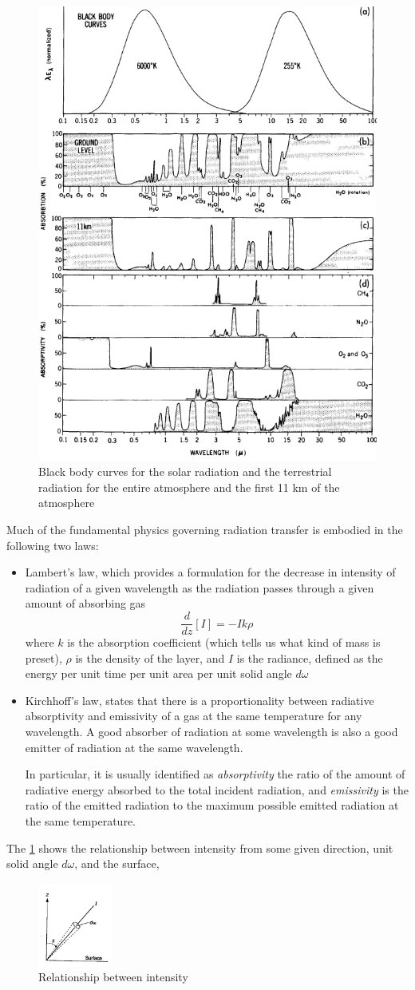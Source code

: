 \begin{figure}[htp!]
	\centering
	\includegraphics[width=0.4\linewidth]{upload/image11.png}
	\caption{Black body curves for the solar radiation and the terrestrial radiation for the entire atmosphere and the first 11 km of the atmosphere}

\end{figure}
Much of the fundamental physics governing radiation transfer is embodied in the following two laws:
\begin{itemize}
	\item Lambert's law, which provides a formulation for the decrease in intensity of radiation of a given wavelength as the radiation passes through a given amount of absorbing gas
	      $$\frac{d}{dz}[I]=-Ik\rho$$
	      where $k$ is the absorption coefficient (which tells us what kind of mass is preset), $\rho$ is the density of the layer, and $I$ is the radiance, defined as the energy per unit time per  unit area per unit solid angle $d\omega$

	\item Kirchhoff's law, states that there is a proportionality between radiative absorptivity and emissivity of a gas at the same temperature for any wavelength. A good absorber of radiation at some wavelength is also a good emitter of radiation at the same wavelength.

	      In particular, it is usually identified as \textit{absorptivity} the ratio of the amount of radiative energy absorbed to the total incident radiation, and \textit{emissivity} is the ratio of the emitted radiation to the maximum possible emitted radiation at the same temperature.
\end{itemize}


The \ref{fig:relat} shows the relationship between intensity from some given direction, unit solid angle $d\omega$, and the surface,
\begin{figure}
	\begin{center}
		\includegraphics[width=0.22\textwidth]{upload/imageIw.png}
	\end{center}
	\caption{Relationship between intensity}
	\label{fig:relat}
\end{figure}

